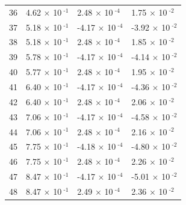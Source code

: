 \documentclass[a4paper,11pt]{article}
\begin{document}
\begin{center}
\begin{longtable}{|R{1.5cm}|R{2.5cm}|R{2.5cm}|R{2.5cm}|}
   36 &         4.62 $\times$ 10$^{\text{          -1}}$  &         2.48 $\times$ 10$^{\text{          -4}}$  &         1.75 $\times$ 10$^{\text{          -2}}$ \\ 
   37 &         5.18 $\times$ 10$^{\text{          -1}}$  &        -4.17 $\times$ 10$^{\text{          -4}}$  &        -3.92 $\times$ 10$^{\text{          -2}}$ \\ 
   38 &         5.18 $\times$ 10$^{\text{          -1}}$  &         2.48 $\times$ 10$^{\text{          -4}}$  &         1.85 $\times$ 10$^{\text{          -2}}$ \\ 
   39 &         5.78 $\times$ 10$^{\text{          -1}}$  &        -4.17 $\times$ 10$^{\text{          -4}}$  &        -4.14 $\times$ 10$^{\text{          -2}}$ \\ 
   40 &         5.77 $\times$ 10$^{\text{          -1}}$  &         2.48 $\times$ 10$^{\text{          -4}}$  &         1.95 $\times$ 10$^{\text{          -2}}$ \\ 
   41 &         6.40 $\times$ 10$^{\text{          -1}}$  &        -4.17 $\times$ 10$^{\text{          -4}}$  &        -4.36 $\times$ 10$^{\text{          -2}}$ \\ 
   42 &         6.40 $\times$ 10$^{\text{          -1}}$  &         2.48 $\times$ 10$^{\text{          -4}}$  &         2.06 $\times$ 10$^{\text{          -2}}$ \\ 
   43 &         7.06 $\times$ 10$^{\text{          -1}}$  &        -4.17 $\times$ 10$^{\text{          -4}}$  &        -4.58 $\times$ 10$^{\text{          -2}}$ \\ 
   44 &         7.06 $\times$ 10$^{\text{          -1}}$  &         2.48 $\times$ 10$^{\text{          -4}}$  &         2.16 $\times$ 10$^{\text{          -2}}$ \\ 
   45 &         7.75 $\times$ 10$^{\text{          -1}}$  &        -4.18 $\times$ 10$^{\text{          -4}}$  &        -4.80 $\times$ 10$^{\text{          -2}}$ \\ 
   46 &         7.75 $\times$ 10$^{\text{          -1}}$  &         2.48 $\times$ 10$^{\text{          -4}}$  &         2.26 $\times$ 10$^{\text{          -2}}$ \\ 
   47 &         8.47 $\times$ 10$^{\text{          -1}}$  &        -4.17 $\times$ 10$^{\text{          -4}}$  &        -5.01 $\times$ 10$^{\text{          -2}}$ \\ 
   48 &         8.47 $\times$ 10$^{\text{          -1}}$  &         2.49 $\times$ 10$^{\text{          -4}}$  &         2.36 $\times$ 10$^{\text{          -2}}$ \\ 

\end{longtable}
\end{center}
\end{document}
